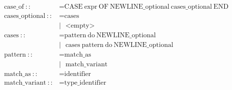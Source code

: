 \documentclass[a4paper,12pt]{book} %
\begin{document}
\begin{align*}
  \text{case\_of}\ ::                 & = \text{CASE}\ \text{expr}\ \text{OF}\ \text{NEWLINE\_optional}\ \text{cases\_optional}\ \text{END}                                                                                                                       \\
  \text{cases\_optional}\ ::          & = \text{cases}                                                                                                                                                                                                            \\
                                      & |\ \ \ \text{<empty>}                                                                                                                                                                                                     \\
  \text{cases}\ ::                    & = \text{pattern}\ \text{do}\ \text{NEWLINE\_optional}                                                                                                                                                                     \\
                                      & |\ \ \ \text{cases}\ \text{pattern}\ \text{do}\ \text{NEWLINE\_optional}                                                                                                                                                  \\
  \text{pattern}\ ::                  & = \text{match\_as}                                                                                                                                                                                                        \\
                                      & |\ \ \ \text{match\_variant}                                                                                                                                                                                              \\
  \text{match\_as}\ ::                & = \text{identifier}                                                                                                                                                                                                       \\
  \text{match\_variant}\ ::           & = \text{type\_identifier}                                                                                                                                                                                                 \\

\end{align*}
\end{document}
